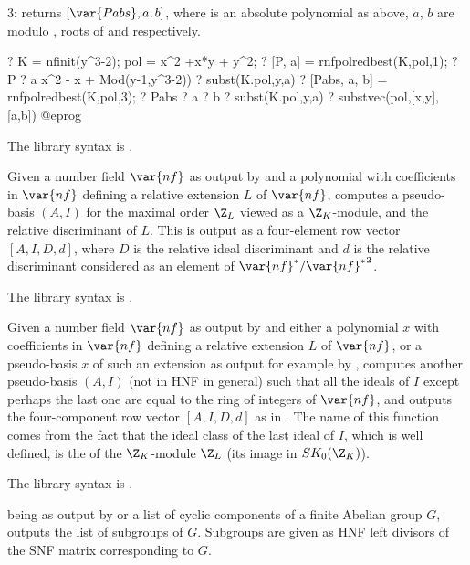 3: returns $[\var{Pabs},a,b]$, where  is an absolute polynomial
as above, $a$, $b$ are  modulo , roots of 
and  respectively.

\bprog
? K = nfinit(y^3-2); pol = x^2 +x*y + y^2;
? [P, a] = rnfpolredbest(K,pol,1);
? P
? a
         x^2 - x + Mod(y-1,y^3-2))
? subst(K.pol,y,a)
? [Pabs, a, b] = rnfpolredbest(K,pol,3);
? Pabs
? a
? b
? subst(K.pol,y,a)
? substvec(pol,[x,y],[a,b])
@eprog

The library syntax is .

\label{se:rnfpseudobasis}
Given a number field
$\var{nf}$ as output by  and a polynomial  with
coefficients in $\var{nf}$ defining a relative extension $L$ of $\var{nf}$,
computes a pseudo-basis $(A,I)$ for the maximal order $\Z_L$ viewed as a
$\Z_K$-module, and the relative discriminant of $L$. This is output as a
four-element row vector $[A,I,D,d]$, where $D$ is the relative ideal
discriminant and $d$ is the relative discriminant considered as an element of
$\var{nf}^*/{\var{nf}^*}^2$.

The library syntax is .

\label{se:rnfsteinitz}
Given a number field $\var{nf}$ as
output by  and either a polynomial $x$ with coefficients in
$\var{nf}$ defining a relative extension $L$ of $\var{nf}$, or a pseudo-basis
$x$ of such an extension as output for example by ,
computes another pseudo-basis $(A,I)$ (not in HNF in general) such that all
the ideals of $I$ except perhaps the last one are equal to the ring of
integers of $\var{nf}$, and outputs the four-component row vector $[A,I,D,d]$
as in . The name of this function comes from the fact
that the ideal class of the last ideal of $I$, which is well defined, is the
 of the $\Z_K$-module $\Z_L$ (its image in $SK_0(\Z_K)$).

The library syntax is .

\label{se:subgrouplist}
 being as output by  or a list of cyclic components
of a finite Abelian group $G$, outputs the list of subgroups of $G$. Subgroups
are given as HNF left divisors of the SNF matrix corresponding to $G$.

